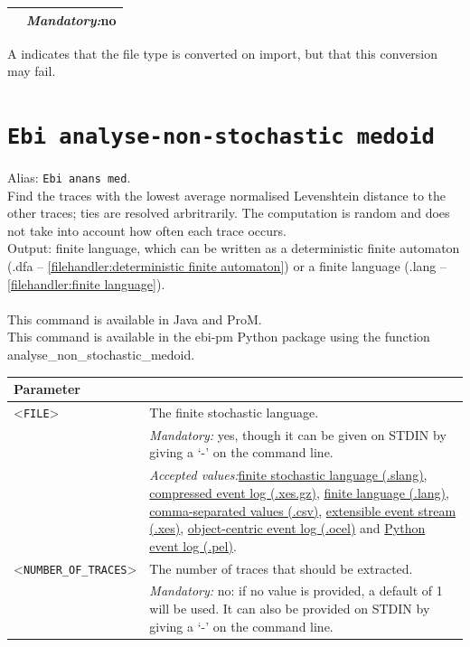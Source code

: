 {\begin{tabularx}{\linewidth}{lX}
&\textit{Mandatory:}\quad no\\
\bottomrule
\end{tabularx}
A \textdagger{} indicates that the file type is converted on import, but that this conversion may fail.
\clearpage\section{\texttt{Ebi analyse-non-stochastic medoid}}
\label{command:Ebi analyse-non-stochastic medoid}
Alias: \texttt{Ebi anans med}.\\
Find the traces with the lowest average normalised Levenshtein distance to the other traces; ties are resolved arbritrarily. The computation is random and does not take into account how often each trace occurs.\\
\noindent Output: finite language, which can be written as a deterministic finite automaton (.dfa -- \cref{filehandler:deterministic finite automaton}) or a finite language (.lang -- \cref{filehandler:finite language}).\\
\\This command is available in Java and ProM.
\\This command is available in the ebi-pm Python package using the function analyse\_non\_stochastic\_medoid.
\begin{tabularx}{\linewidth}{lX}
\toprule
Parameter \\\midrule
<\texttt{FILE}>&The finite stochastic language.\\
&\textit{Mandatory:} \quad yes, though it can be given on STDIN by giving a `-' on the command line.\\
&\textit{Accepted values:}\quad \hyperref[filehandler:finite stochastic language]{finite stochastic language (.slang)}, \hyperref[filehandler:compressed event log]{compressed event log (.xes.gz)}, \hyperref[filehandler:finite language]{finite language (.lang)}, \hyperref[filehandler:comma-separated values]{comma-separated values (.csv)}, \hyperref[filehandler:extensible event stream]{extensible event stream (.xes)}, \hyperref[filehandler:object-centric event log]{object-centric event log (.ocel)} and \hyperref[filehandler:Python event log]{Python event log (.pel)}.\\
<\texttt{NUMBER\_OF\_TRACES}>&The number of traces that should be extracted.\\
&\textit{Mandatory:} \quad no: if no value is provided, a default of 1 will be used. It can also be provided on STDIN by giving a `-' on the command line.\\

\end{tabularx}}
